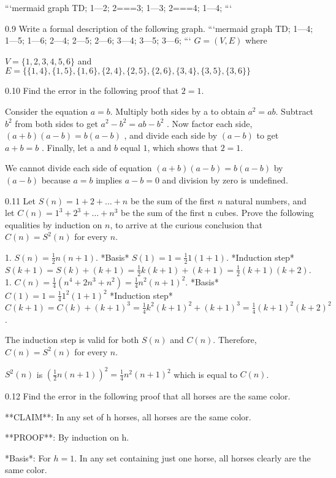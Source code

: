 \documentclass[12pt, a4paper]{article}
\begin{document}
```mermaid
graph TD;
    1---2;
    2===3;
    1---3;
    2===4;
    1---4;
```

0.9
Write a formal description of the following graph.
```mermaid
graph TD;
    1---4;
    1---5;
    1---6;
    2---4;
    2---5;
    2---6;
    3---4;
    3---5;
    3---6;
```
$G = (V, E)$ where 

$V = \{1, 2, 3, 4, 5, 6\}$ and $E = \{\{1, 4\}, \{1, 5\}, \{1, 6\}, \{2, 4\}, \{2, 5\}, \{2, 6\}, \{3, 4\}, \{3, 5\}, \{3, 6\}\}$


0.10
Find the error in the following proof that $2 = 1$. 

Consider the equation $a = b$. Multiply both sides by a to obtain 
$a^2 = ab$. 
Subtract 
$b^2$ 
from both sides to get 
$a^2 - b^2 = ab - b^2$
. Now factor each side, 
$(a + b)(a - b) = b(a - b)$
, and divide each side by 
$(a - b)$ 
to get 
$a + b = b$
. Finally, let a and $b$ equal $1$, which shows that $2 = 1$.


We cannot divide each side of equation $(a + b)(a - b) = b(a - b)$ by $(a - b)$ because $a = b$ implies $a - b = 0$ and division by zero is undefined.

0.11
Let $S(n) = 1 + 2 + \ldots + n$ be the sum of the first $n$ natural numbers, and let $C(n) = 1^3 + 2^3 + \ldots + n^3$ be the sum of the first n cubes. Prove the following equalities by induction on $n$, to arrive at the curious conclusion that $C(n) = S^2(n)$ for every $n$.

1. $S(n) = \frac{1}{2} n(n+1)$.
*Basis*
$ S(1) = 1 = \frac{1}{2} 1(1+1)$.
*Induction step*
$ S(k+1) = S(k) + (k+1) = \frac{1}{2} k(k+1) + (k+1) = \frac{1}{2} (k+1)(k+2)$.
1. $C(n) = \frac{1}{4}(n^4 + 2n^3 + n^2) = \frac{1}{4} n^2(n+1)^2$.
*Basis*
$ C(1) = 1 = \frac{1}{4} 1^2(1+1)^2$
*Induction step*
$ C(k+1) = C(k) + (k+1)^3 = \frac{1}{4} k^2(k+1)^2 + (k+1)^3 = \frac{1}{4} (k+1)^2(k+2)^2$.

The induction step is valid for both $S(n)$ and $C(n)$. Therefore, $C(n) = S^2(n)$ for every $n$.

$S^2(n)$ is $(\frac{1}{2} n(n+1))^2 = \frac{1}{4} n^2(n+1)^2$ which is equal to $C(n)$.

0.12
Find the error in the following proof that all horses are the same color.

**CLAIM**: In any set of h horses, all horses are the same color.

**PROOF**: By induction on h.

*Basis*: For $h = 1$. In any set containing just one horse, all horses clearly are the same color.
\end{document}
